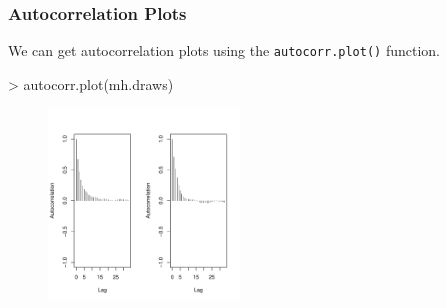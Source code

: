 \documentclass[handout]{beamer}
\begin{document}
\begin{frame}

\begin{figure}[!htp]
\begin{center}
\end{center}
\end{figure}
\end{frame}

\begin{frame}[fragile]
\frametitle{Autocorrelation Plots}
\pause
We can get autocorrelation plots using the {\tt autocorr.plot()} function.
\pause
\medskip
\tiny
\begin{Schunk}
\begin{Sinput}
> autocorr.plot(mh.draws)
\end{Sinput}
\end{Schunk}
\begin{figure}[!htp]
\begin{center}
\includegraphics[width=2in, height=2in]{convergence-autocorr.pdf}
\end{center}
\end{figure}
\normalsize
\end{frame}
\end{document}
